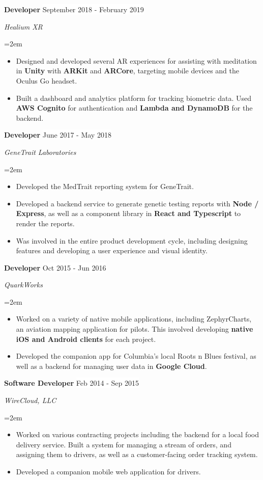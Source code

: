 \documentclass[paper=a4,fontsize=9pt]{scrartcl} %
\newcommand{\sepspace}{\vspace*{0.8em}}		%
\newcommand{\EducationEntry}[4]{
			\noindent \textbf{#1} \hfill      %
			\colorbox{Black}{%
				\parbox{6em}{%
				\hfill\color{White}#2}} \par  %
			\noindent \textit{#3} \par        %
			\noindent\hangindent=2em\hangafter=0 \small #4 %
			\normalsize \par}
\newcommand{\WorkEntry}[4]{				  %
			\noindent \textbf{#1} \hfill      %
			\colorbox{White}{\color{Black}#2} \par  %
			\noindent \textit{#3} \par              %
			\noindent\hangindent=2em\hangafter=0 \small #4 %
			\normalsize \par}
\begin{document}
	\WorkEntry{Developer}{September 2018 - February 2019}{Healium XR}{
		\begin{itemize}
			\item Designed and developed several AR experiences for assisting with meditation in \textbf{Unity} with \textbf{ARKit} and \textbf{ARCore}, targeting mobile devices and the Oculus Go headset.
			\item Built a dashboard and analytics platform for tracking biometric data. Used \textbf{AWS Cognito} for authentication and \textbf{Lambda and DynamoDB} for the backend.
		\end{itemize}
	}
	\sepspace

	\WorkEntry{Developer}{June 2017 - May 2018}{GeneTrait Laboratories}{
		\begin{itemize}
			\item Developed the MedTrait reporting system for GeneTrait.
			\item Developed a backend service to generate genetic testing reports with \textbf{Node / Express}, as well as a component library in \textbf{React and Typescript} to render the reports.
			\item Was involved in the entire product development cycle, including designing features and developing a user experience and visual identity.
		\end{itemize}
	}
	\sepspace

	\WorkEntry{Developer}{Oct 2015 - Jun 2016}{QuarkWorks}{
		\begin{itemize}
			\item Worked on a variety of native mobile applications, including ZephyrCharts, an aviation mapping application for pilots. This involved developing \textbf{native iOS and Android clients} for each project.
			\item Developed the companion app for Columbia's local Roots n Blues festival, as well as a backend for managing user data in \textbf{Google Cloud}.
		\end{itemize}
	}
	\sepspace
	
	\WorkEntry{Software Developer}{Feb 2014 - Sep 2015}{WireCloud, LLC}{
		\begin{itemize}
			\item Worked on various contracting projects including the backend for a local food delivery service. Built a system for managing a stream of orders, and assigning them to drivers, as well as a customer-facing order tracking system. 
			\item Developed a companion mobile web application for drivers.
		\end{itemize}
	}
	\sepspace
	
\end{document}
